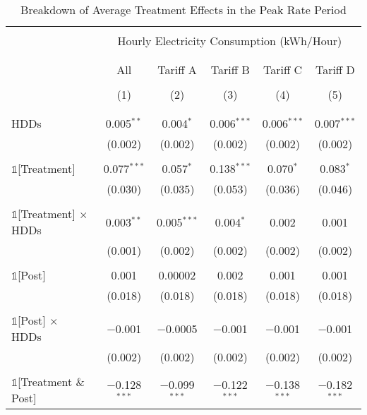 \begin{table}[!htbp]
\caption{Breakdown of Average Treatment Effects in the Peak Rate Period}
\centering
\small
\begin{tabular}{@{\extracolsep{20pt}}lccccc}
\\[-5.5ex]
\hline \hline
\\[-3.0ex]
& \multicolumn{5}{c}{Hourly Electricity Consumption  (kWh/Hour)} \\
\\[-3.0ex]
\cline{2-6}
\\[-3.0ex]
& All & Tariff A & Tariff B & Tariff C & Tariff D \\
\\[-4.0ex]
 & (1) & (2) & (3) & (4) & (5) \\
\\[-3.0ex]
\hline
\\[-2.0ex]
HDDs & 0.005$^{**}$ & 0.004$^{*}$ & 0.006$^{***}$ & 0.006$^{***}$ & 0.007$^{***}$  \\
& (0.002) & (0.002) & (0.002) & (0.002) & (0.002)  \\
& & \\
$\mathbb{1}$[Treatment] & 0.077$^{***}$ & 0.057$^{*}$ & 0.138$^{***}$ & 0.070$^{*}$ & 0.083$^{*}$ \\
& (0.030) & (0.035) & (0.053) & (0.036) & (0.046) \\
& & \\
$\mathbb{1}$[Treatment] $\times$ HDDs & 0.003$^{**}$ & 0.005$^{***}$ & 0.004$^{*}$ & 0.002 & 0.001 \\
& (0.001) & (0.002) & (0.002) & (0.002) & (0.002) \\
& & \\
$\mathbb{1}$[Post] & 0.001 & 0.00002 & 0.002 & 0.001 & 0.001 \\
& (0.018) & (0.018) & (0.018) & (0.018) & (0.018) \\
& & \\
$\mathbb{1}$[Post] $\times$ HDDs & $-$0.001 & $-$0.0005 & $-$0.001 & $-$0.001 & $-$0.001 \\
& (0.002) & (0.002) & (0.002) & (0.002) & (0.002) \\
& & \\
$\mathbb{1}$[Treatment \& Post] & $-$0.128$^{***}$ & $-$0.099$^{***}$ & $-$0.122$^{***}$ & $-$0.138$^{***}$ & $-$0.182$^{***}$ \\

\end{tabular}
\end{table}
